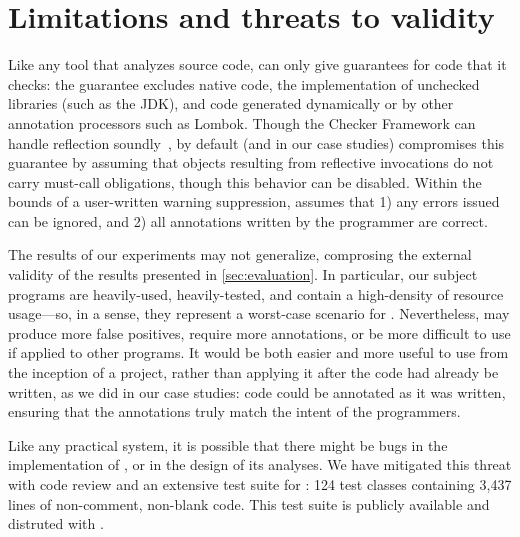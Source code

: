 \section{Limitations and threats to validity}
\label{sec:threats}

Like any tool that analyzes source code, \Tool can only
give guarantees for code that it checks: the guarantee
excludes native code, the implementation of unchecked libraries (such as the JDK),
and code generated dynamically or by other annotation processors
such as Lombok. Though the Checker Framework can handle
reflection soundly~\cite{BarrosJMVDdAE2015}, by default (and in our case studies)
\Tool compromises this guarantee
by assuming that objects resulting from reflective invocations
do not carry must-call obligations, though this behavior can
be disabled.
Within the bounds
of a user-written warning suppression, \Tool assumes that 1)
any errors issued can be ignored, and 2) all annotations
written by the programmer are correct.

The results of our experiments may not generalize, comprosing the
external validity of the results presented in
\cref{sec:evaluation}. In particular, our subject programs are
heavily-used, heavily-tested, and contain a high-density of resource
usage---so, in a sense, they represent a worst-case scenario for
\Tool.  Nevertheless, \Tool may produce more false positives, require
more annotations, or be more difficult to use if applied to other
programs.  It would be both easier and more useful to use \Tool from
the inception of a project, rather than applying it after the code had
already be written, as we did in our case studies: code could be
annotated as it was written, ensuring that the annotations truly match
the intent of the programmers.

Like any practical system, it is possible that there might
be bugs in the implementation of \Tool, or in the design of
its analyses. We have mitigated this threat with code review and an extensive
test suite for \Tool:
124 test classes containing
3,437 lines of non-comment, non-blank code.
This test suite is publicly available and distruted with \Tool.
